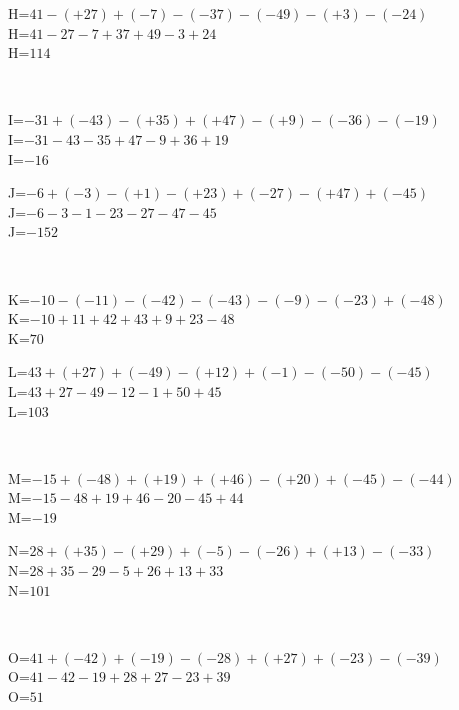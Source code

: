 \documentclass{article}%
\begin{document}
\begin{minipage}{0.5\textwidth}%
H=$41-(+27)+(-7)-(-37)-(-49)-(+3)-(-24)$\\%
H=$41-27-7+37+49-3+24$\\%
H=$114$\\%
\end{minipage}%
\\%
\begin{minipage}{0.5\textwidth}%
I=$-31+(-43)-(+35)+(+47)-(+9)-(-36)-(-19)$\\%
I=$-31-43-35+47-9+36+19$\\%
I=$-16$\\%
\end{minipage}%
\begin{minipage}{0.5\textwidth}%
J=$-6+(-3)-(+1)-(+23)+(-27)-(+47)+(-45)$\\%
J=$-6-3-1-23-27-47-45$\\%
J=$-152$\\%
\end{minipage}%
\\%
\begin{minipage}{0.5\textwidth}%
K=$-10-(-11)-(-42)-(-43)-(-9)-(-23)+(-48)$\\%
K=$-10+11+42+43+9+23-48$\\%
K=$70$\\%
\end{minipage}%
\begin{minipage}{0.5\textwidth}%
L=$43+(+27)+(-49)-(+12)+(-1)-(-50)-(-45)$\\%
L=$43+27-49-12-1+50+45$\\%
L=$103$\\%
\end{minipage}%
\\%
\begin{minipage}{0.5\textwidth}%
M=$-15+(-48)+(+19)+(+46)-(+20)+(-45)-(-44)$\\%
M=$-15-48+19+46-20-45+44$\\%
M=$-19$\\%
\end{minipage}%
\begin{minipage}{0.5\textwidth}%
N=$28+(+35)-(+29)+(-5)-(-26)+(+13)-(-33)$\\%
N=$28+35-29-5+26+13+33$\\%
N=$101$\\%
\end{minipage}%
\\%
\begin{minipage}{0.5\textwidth}%
O=$41+(-42)+(-19)-(-28)+(+27)+(-23)-(-39)$\\%
O=$41-42-19+28+27-23+39$\\%
O=$51$\\%
\end{minipage}%
\end{document}
